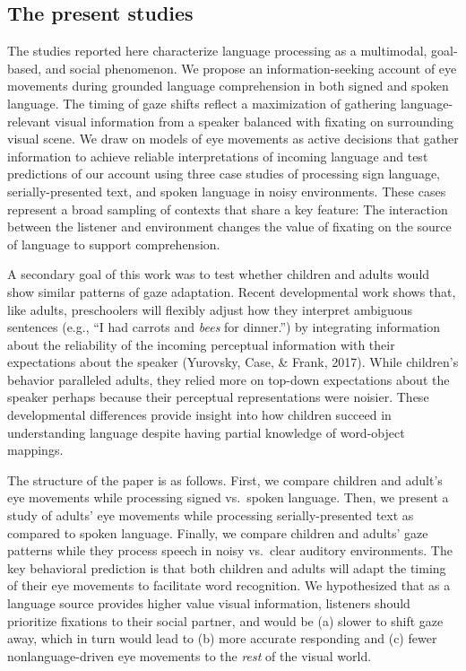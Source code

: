 \documentclass[english,floatsintext,man]{apa6}
\begin{document}
\hypertarget{the-present-studies}{%
\subsection{The present studies}\label{the-present-studies}}

The studies reported here characterize language processing as a
multimodal, goal-based, and social phenomenon. We propose an
information-seeking account of eye movements during grounded language
comprehension in both signed and spoken language. The timing of gaze
shifts reflect a maximization of gathering language-relevant visual
information from a speaker balanced with fixating on surrounding visual
scene. We draw on models of eye movements as active decisions that
gather information to achieve reliable interpretations of incoming
language and test predictions of our account using three case studies of
processing sign language, serially-presented text, and spoken language
in noisy environments. These cases represent a broad sampling of
contexts that share a key feature: The interaction between the listener
and environment changes the value of fixating on the source of language
to support comprehension.

A secondary goal of this work was to test whether children and adults
would show similar patterns of gaze adaptation. Recent developmental
work shows that, like adults, preschoolers will flexibly adjust how they
interpret ambiguous sentences (e.g., \enquote{I had carrots and
\emph{bees} for dinner.}) by integrating information about the
reliability of the incoming perceptual information with their
expectations about the speaker (Yurovsky, Case, \& Frank, 2017). While
children's behavior paralleled adults, they relied more on top-down
expectations about the speaker perhaps because their perceptual
representations were noisier. These developmental differences provide
insight into how children succeed in understanding language despite
having partial knowledge of word-object mappings.

The structure of the paper is as follows. First, we compare children and
adult's eye movements while processing signed vs.~spoken language. Then,
we present a study of adults' eye movements while processing
serially-presented text as compared to spoken language. Finally, we
compare children and adults' gaze patterns while they process speech in
noisy vs.~clear auditory environments. The key behavioral prediction is
that both children and adults will adapt the timing of their eye
movements to facilitate word recognition. We hypothesized that as a
language source provides higher value visual information, listeners
should prioritize fixations to their social partner, and would be (a)
slower to shift gaze away, which in turn would lead to (b) more accurate
responding and (c) fewer nonlanguage-driven eye movements to the
\emph{rest} of the visual world.
\end{document}
